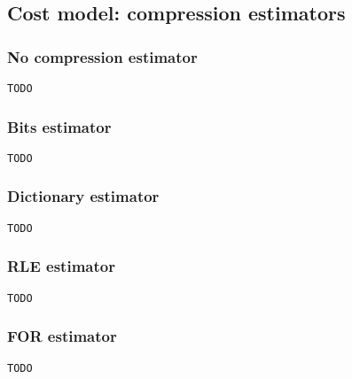 \subsection{Cost model: compression estimators}
\label{sub:estimators}




% 

\subsubsection{No compression estimator}
\label{subsub:estimator:nocompression}

\begin{verbatim}
TODO
\end{verbatim}

\subsubsection{Bits estimator}
\label{subsub:estimator:bits}

\begin{verbatim}
TODO
\end{verbatim}

\subsubsection{Dictionary estimator}
\label{subsub:estimator:dict}

\begin{verbatim}
TODO
\end{verbatim}

\subsubsection{RLE estimator}
\label{subsub:estimator:rle}

\begin{verbatim}
TODO
\end{verbatim}

\subsubsection{FOR estimator}
\label{subsub:estimator:for}

\begin{verbatim}
TODO
\end{verbatim}

